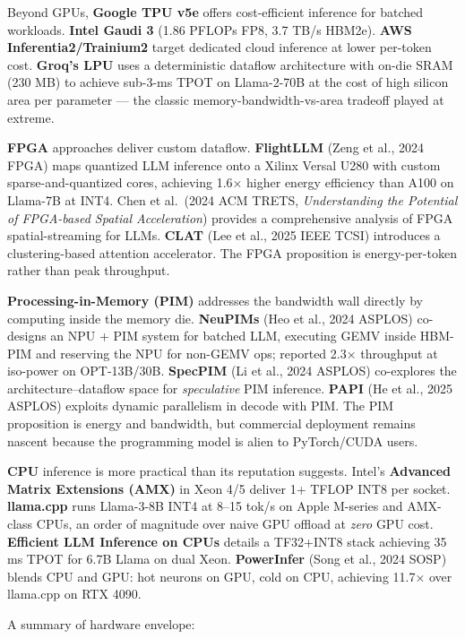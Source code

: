 \documentclass{article}
\begin{document}
Beyond GPUs, \textbf{Google TPU v5e} offers cost-efficient inference for batched workloads. \textbf{Intel Gaudi 3} (1.86 PFLOPs FP8, 3.7 TB/s HBM2e). \textbf{AWS Inferentia2/Trainium2} target dedicated cloud inference at lower per-token cost. \textbf{Groq's LPU} uses a deterministic dataflow architecture with on-die SRAM (230 MB) to achieve sub-3-ms TPOT on Llama-2-70B at the cost of high silicon area per parameter --- the classic memory-bandwidth-vs-area tradeoff played at extreme.

\textbf{FPGA} approaches deliver custom dataflow. \textbf{FlightLLM} (Zeng et al., 2024 FPGA) maps quantized LLM inference onto a Xilinx Versal U280 with custom sparse-and-quantized cores, achieving 1.6× higher energy efficiency than A100 on Llama-7B at INT4. Chen et al.~(2024 ACM TRETS, \emph{Understanding the Potential of FPGA-based Spatial Acceleration}) provides a comprehensive analysis of FPGA spatial-streaming for LLMs. \textbf{CLAT} (Lee et al., 2025 IEEE TCSI) introduces a clustering-based attention accelerator. The FPGA proposition is energy-per-token rather than peak throughput.

\textbf{Processing-in-Memory (PIM)} addresses the bandwidth wall directly by computing inside the memory die. \textbf{NeuPIMs} (Heo et al., 2024 ASPLOS) co-designs an NPU + PIM system for batched LLM, executing GEMV inside HBM-PIM and reserving the NPU for non-GEMV ops; reported 2.3× throughput at iso-power on OPT-13B/30B. \textbf{SpecPIM} (Li et al., 2024 ASPLOS) co-explores the architecture--dataflow space for \emph{speculative} PIM inference. \textbf{PAPI} (He et al., 2025 ASPLOS) exploits dynamic parallelism in decode with PIM. The PIM proposition is energy and bandwidth, but commercial deployment remains nascent because the programming model is alien to PyTorch/CUDA users.

\textbf{CPU} inference is more practical than its reputation suggests. Intel's \textbf{Advanced Matrix Extensions (AMX)} in Xeon 4/5 deliver 1+ TFLOP INT8 per socket. \textbf{llama.cpp} runs Llama-3-8B INT4 at 8--15 tok/s on Apple M-series and AMX-class CPUs, an order of magnitude over naive GPU offload at \emph{zero} GPU cost. \textbf{Efficient LLM Inference on CPUs} \citep{shen20232023} details a TF32+INT8 stack achieving 35 ms TPOT for 6.7B Llama on dual Xeon. \textbf{PowerInfer} (Song et al., 2024 SOSP) blends CPU and GPU: hot neurons on GPU, cold on CPU, achieving 11.7× over llama.cpp on RTX 4090.

A summary of hardware envelope:
\end{document}
